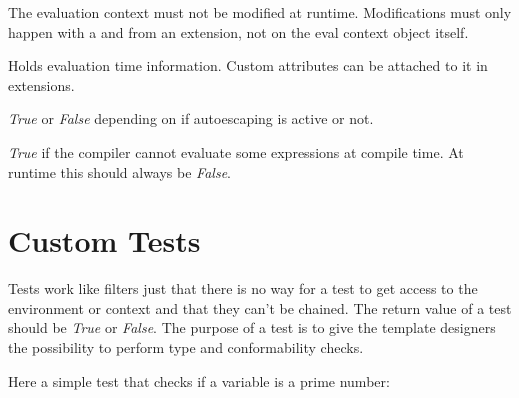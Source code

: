 \documentclass[a4paper,10pt,english]{sphinxmanual}
\begin{document}
The evaluation context must not be modified at runtime.  Modifications
must only happen with a {\hyperref[extensions:jinja2.nodes.EvalContextModifier]{}} and
{\hyperref[extensions:jinja2.nodes.ScopedEvalContextModifier]{}} from an extension, not on the
eval context object itself.

\begin{fulllineitems}
\label{api:jinja2.nodes.EvalContext}
Holds evaluation time information.  Custom attributes can be attached
to it in extensions.

\begin{fulllineitems}
\label{api:jinja2.EvalContext.autoescape}
\emph{True} or \emph{False} depending on if autoescaping is active or not.

\end{fulllineitems}


\begin{fulllineitems}
\label{api:jinja2.EvalContext.volatile}
\emph{True} if the compiler cannot evaluate some expressions at compile
time.  At runtime this should always be \emph{False}.

\end{fulllineitems}


\end{fulllineitems}



\section{Custom Tests}
\label{api:writing-tests}\label{api:custom-tests}
Tests work like filters just that there is no way for a test to get access
to the environment or context and that they can't be chained.  The return
value of a test should be \emph{True} or \emph{False}.  The purpose of a test is to
give the template designers the possibility to perform type and conformability
checks.

Here a simple test that checks if a variable is a prime number:
\end{document}
